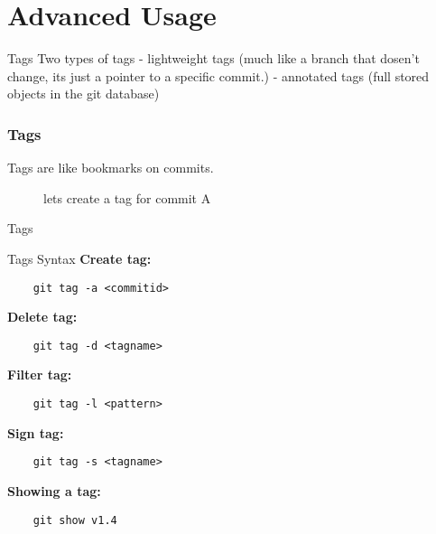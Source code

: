 \section{Advanced Usage}


\begin{frame}[fragile]{Tags}
    Two types of tags
    - lightweight tags (much like a branch that dosen't change, its just a pointer to
    a specific commit.)
    - annotated tags (full stored objects in the git database)
\end{frame}

\begin{frame}
    \frametitle{Tags}
    Tags are like bookmarks on commits.
    \begin{figure}[b]
        \centering
        \caption{lets create a tag for commit A}
    \end{figure}
\end{frame}

\begin{frame}[fragile]{Tags}
    \mytag
    \begin{figure}[b]
        \centering
    \end{figure}
\end{frame}

\begin{frame}[fragile]{Tags Syntax}
    \textbf{Create tag:}
    \begin{lstlisting}
    git tag -a <commitid>
    \end{lstlisting}
    \textbf{Delete tag:}
    \begin{lstlisting}
    git tag -d <tagname>
    \end{lstlisting}
    \textbf{Filter tag:}
    \begin{lstlisting}
    git tag -l <pattern>
    \end{lstlisting}
    \textbf{Sign tag:}
    \begin{lstlisting}
    git tag -s <tagname>
    \end{lstlisting}
    \textbf{Showing a tag:}
    \begin{lstlisting}
    git show v1.4
    \end{lstlisting}
\end{frame}

